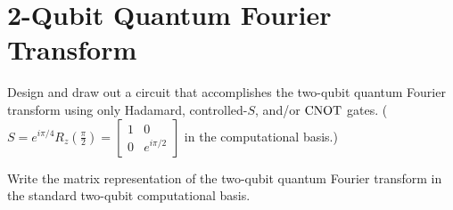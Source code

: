 \documentclass{../phys084}
\begin{document}
\begin{solution}
  \begin{problems}
  \item
  \item
  \end{problems}
\end{solution}

\section{2-Qubit Quantum Fourier Transform}

\begin{exercise}
  \begin{problems}
  \item Design and draw out a circuit that accomplishes the two-qubit
    quantum Fourier transform using only Hadamard, controlled-\(S\),
    and/or \(\operatorname{CNOT}\) gates.  (\(S = e^{i\pi/4}R_z(\frac \pi 2) =
    \begin{bmatrix}
      1 & 0 \\ 0 & e^{i\pi/2}
    \end{bmatrix}
    \) in the computational basis.)

  \item Write the matrix representation of the two-qubit quantum
    Fourier transform in the standard two-qubit computational basis.
  \end{problems}
\end{exercise}

\begin{solution}
  \begin{problems}
  \item
  \item
  \end{problems}
\end{solution}
\end{document}

